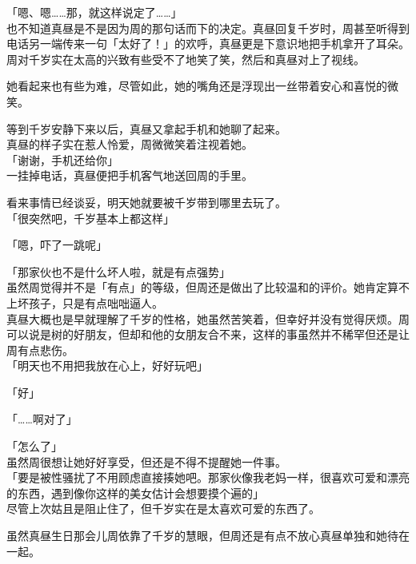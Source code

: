 「嗯、嗯……那，就这样说定了……」\\

也不知道真昼是不是因为周的那句话而下的决定。真昼回复千岁时，周甚至听得到电话另一端传来一句「太好了！」的欢呼，真昼更是下意识地把手机拿开了耳朵。\\

周对千岁实在太高的兴致有些受不了地笑了笑，然后和真昼对上了视线。

她看起来也有些为难，尽管如此，她的嘴角还是浮现出一丝带着安心和喜悦的微笑。

等到千岁安静下来以后，真昼又拿起手机和她聊了起来。\\

真昼的样子实在惹人怜爱，周微微笑着注视着她。\\

「谢谢，手机还给你」\\

一挂掉电话，真昼便把手机客气地送回周的手里。

看来事情已经谈妥，明天她就要被千岁带到哪里去玩了。\\

「很突然吧，千岁基本上都这样」

「嗯，吓了一跳呢」

「那家伙也不是什么坏人啦，就是有点强势」\\

虽然周觉得并不是「有点」的等级，但周还是做出了比较温和的评价。她肯定算不上坏孩子，只是有点咄咄逼人。\\

真昼大概也是早就理解了千岁的性格，她虽然苦笑着，但幸好并没有觉得厌烦。周可以说是树的好朋友，但却和他的女朋友合不来，这样的事虽然并不稀罕但还是让周有点悲伤。\\

「明天也不用把我放在心上，好好玩吧」

「好」

「……啊对了」

「怎么了」\\

虽然周很想让她好好享受，但还是不得不提醒她一件事。\\

「要是被性骚扰了不用顾虑直接揍她吧。那家伙像我老妈一样，很喜欢可爱和漂亮的东西，遇到像你这样的美女估计会想要摸个遍的」\\

尽管上次姑且是阻止住了，但千岁实在是太喜欢可爱的东西了。

虽然真昼生日那会儿周依靠了千岁的慧眼，但周还是有点不放心真昼单独和她待在一起。\\

